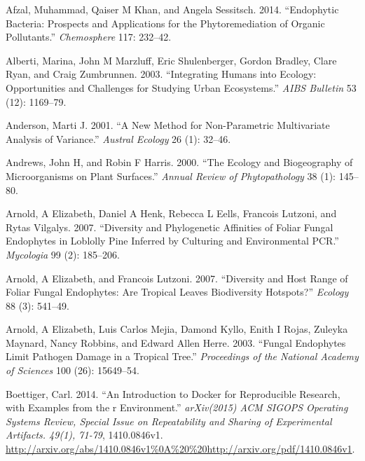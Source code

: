\documentclass[fleqn,10pt,lineno]{wlpeerj} %
\newlength{\cslhangindent}
\newenvironment{CSLReferences}[2] %
 {%
  \setlength{\parindent}{0pt}
  \ifodd #1 \everypar{\setlength{\hangindent}{\cslhangindent}}\ignorespaces\fi
  \ifnum #2 > 0
  \setlength{\parskip}{#2\baselineskip}
  \fi
 }%
 {}
\begin{document}
\hypertarget{refs}{}
\begin{CSLReferences}{1}{0}
\leavevmode{}%
Afzal, Muhammad, Qaiser M Khan, and Angela Sessitsch. 2014. {``Endophytic Bacteria: Prospects and Applications for the Phytoremediation of Organic Pollutants.''} \emph{Chemosphere} 117: 232--42.

\leavevmode{}%
Alberti, Marina, John M Marzluff, Eric Shulenberger, Gordon Bradley, Clare Ryan, and Craig Zumbrunnen. 2003. {``Integrating Humans into Ecology: Opportunities and Challenges for Studying Urban Ecosystems.''} \emph{AIBS Bulletin} 53 (12): 1169--79.

\leavevmode{}%
Anderson, Marti J. 2001. {``A New Method for Non-Parametric Multivariate Analysis of Variance.''} \emph{Austral Ecology} 26 (1): 32--46.

\leavevmode{}%
Andrews, John H, and Robin F Harris. 2000. {``The Ecology and Biogeography of Microorganisms on Plant Surfaces.''} \emph{Annual Review of Phytopathology} 38 (1): 145--80.

\leavevmode{}%
Arnold, A Elizabeth, Daniel A Henk, Rebecca L Eells, Francois Lutzoni, and Rytas Vilgalys. 2007. {``Diversity and Phylogenetic Affinities of Foliar Fungal Endophytes in Loblolly Pine Inferred by Culturing and Environmental {PCR}.''} \emph{Mycologia} 99 (2): 185--206.

\leavevmode{}%
Arnold, A Elizabeth, and Francois Lutzoni. 2007. {``Diversity and Host Range of Foliar Fungal Endophytes: Are Tropical Leaves Biodiversity Hotspots?''} \emph{Ecology} 88 (3): 541--49.

\leavevmode{}%
Arnold, A Elizabeth, Luis Carlos Mejia, Damond Kyllo, Enith I Rojas, Zuleyka Maynard, Nancy Robbins, and Edward Allen Herre. 2003. {``Fungal Endophytes Limit Pathogen Damage in a Tropical Tree.''} \emph{Proceedings of the National Academy of Sciences} 100 (26): 15649--54.

\leavevmode{}%
Boettiger, Carl. 2014. {``An Introduction to Docker for Reproducible Research, with Examples from the r Environment.''} \emph{arXiv(2015) ACM SIGOPS Operating Systems Review, Special Issue on Repeatability and Sharing of Experimental Artifacts. 49(1), 71-79}, 1410.0846v1. \url{http://arxiv.org/abs/1410.0846v1\%0A\%20\%20http://arxiv.org/pdf/1410.0846v1}.


\end{CSLReferences}
\end{document}
